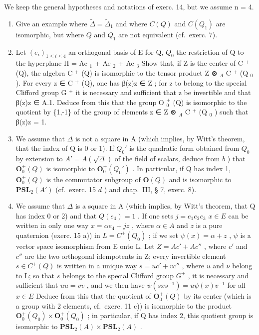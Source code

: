 We keep the general hypotheses and notations of exerc. 14, but we assume n = 4.

\begin{enumerate}
\def\labelenumi{\alph{enumi})}
\item
  Give an example where \(\tilde{\Delta} = \tilde{\Delta}_{1}\) and where \(C(Q)\) and \(C(Q_{1})\) are isomorphic, but where \(Q\) and \(Q_{1}\) are not equivalent (cf.~exerc. 7).
\item
  Let \((e_i)_{1\leqslant i\leqslant 4}\) an orthogonal basis of E for Q, \(Q_0\) the restriction of Q to the hyperplane H = Ae \(_1\) + Ae \(_2\) + Ae \(_3\) Show that, if Z is the center of C \(^+\) (Q), the algebra C \(^+\) (Q) is isomorphic to the tensor product Z ⊗ \(_A\) C \(^+\) (Q \(_0\) ). For every z ∈ C \(^+\) (Q), one has β(z)z ∈ Z ; for z to belong to the special Clifford group G \(^+\) it is necessary and sufficient that z be invertible and that β(z)z ∈ A.1. Deduce from this that the group O \(_0^+\) (Q) is isomorphic to the quotient by \{1,-1\} of the group of elements z ∈ Z ⊗ \(_A\) C \(^+\) (Q \(_0\) ) such that β(z)z = 1.
\item
  We assume that \(\Delta\) is not a square in A (which implies, by Witt's theorem, that the index of Q is 0 or 1). If \(Q_0'\) is the quadratic form obtained from \(Q_0\) by extension to \(A' = A(\sqrt{\Delta})\) of the field of scalars, deduce from \(b\) ) that \(\mathbf{O}_0^+(Q)\) is isomorphic to \(\mathbf{O}_0^+(Q_0')\) . In particular, if Q has index 1, \(\mathbf{O}_0^+(Q)\) is the commutator subgroup of \(\mathbf{O}(Q)\) and is isomorphic to \(\mathbf{PSL}_2(A')\) (cf.~exerc. 15 \(d\) ) and chap.~III, § 7, exerc. 8).
\item
  We assume that \(\Delta\) is a square in A (which implies, by Witt's theorem, that Q has index 0 or 2) and that \(Q(e_4) = 1\) . If one sets \(j = e_1e_2e_3\)  \(x \in E\) can be written in only one way \(x = \alpha e_4 + jz\) , where \(\alpha \in A\) and \(z\) is a pure quaternion (exerc. 15 a)) in \(L = C^+(Q_0)\) ; if we set \(\psi(x) = \alpha + z\) , \(\psi\) is a vector space isomorphism from E onto L. Let \(Z = Ac' + Ac''\) , where \(c'\) and \(c''\) are the two orthogonal idempotents in Z; every invertible element \(s \in C^+(Q)\) is written in a unique way \(s = uc' + vc''\) , where \(u\) and \(\nu\) belong to L; so that \(s\) belongs to the special Clifford group \(G^+\) , it is necessary and sufficient that \(u\bar{u} = v\bar{v}\) , and we then have \(\psi(sxs^{-1}) = u\psi(x)v^{-1}\) for all \(x \in E\) Deduce from this that the quotient of \(\mathbf{O}_0^+(Q)\) by its center (which is a group with 2 elements, cf.~exerc. 11 c)) is isomorphic to the product \(\mathbf{O}_0^+(Q_0) \times \mathbf{O}_0^+(Q_0)\) ; in particular, if Q has index 2, this quotient group is isomorphic to \(\mathbf{PSL}_2(A) \times \mathbf{PSL}_2(A)\) .
\end{enumerate}

